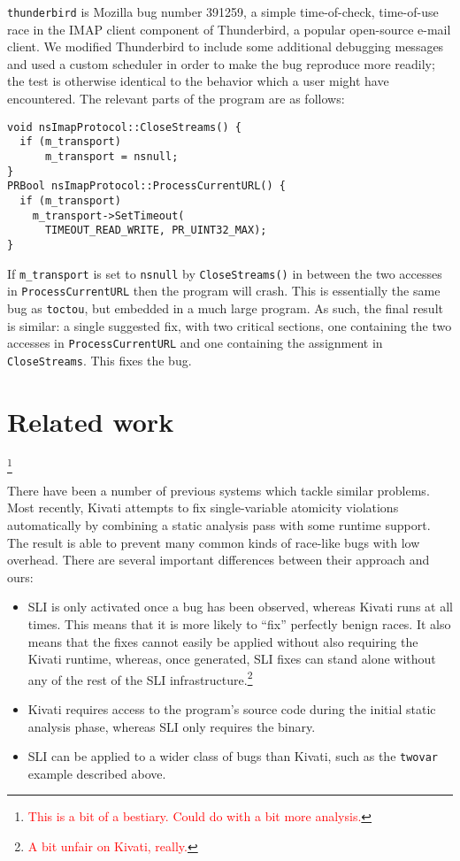 \documentclass[10pt,twocolumn,preprint,natbib,authoryear]{sigplanconf}
\newcommand{\editorial}[1]{\textcolor{red}{\footnote{\textcolor{red}{#1}}}}
\begin{document}
\verb|thunderbird| is Mozilla bug number
391259\cite{thunderbird39125}, a simple time-of-check, time-of-use
race in the IMAP client component of Thunderbird, a popular
open-source e-mail client.  We modified Thunderbird to include some
additional debugging messages and used a custom scheduler in order to
make the bug reproduce more readily; the test is otherwise identical
to the behavior which a user might have encountered.  The relevant
parts of the program are as follows:

\begin{verbatim}
void nsImapProtocol::CloseStreams() {
  if (m_transport)
      m_transport = nsnull;
}
PRBool nsImapProtocol::ProcessCurrentURL() {
  if (m_transport)
    m_transport->SetTimeout(
      TIMEOUT_READ_WRITE, PR_UINT32_MAX);
}
\end{verbatim}

\noindent
If \verb|m_transport| is set to \verb|nsnull| by \verb|CloseStreams()|
in between the two accesses in \verb|ProcessCurrentURL| then the
program will crash.  This is essentially the same bug as
\verb|toctou|, but embedded in a much large program.  As such, the
final result is similar: a single suggested fix, with two critical
sections, one containing the two accesses in \verb|ProcessCurrentURL|
and one containing the assignment in \verb|CloseStreams|.  This fixes
the bug.

\section{Related work}\editorial{This is a bit of a bestiary.  Could do with a bit more analysis.}

There have been a number of previous systems which tackle similar
problems.  Most recently, Kivati\cite{Chew2010a} attempts to fix
single-variable atomicity violations automatically by combining a
static analysis pass with some runtime support.  The result is able to
prevent many common kinds of race-like bugs with low overhead.  There
are several important differences between their approach and ours:

\begin{itemize}
\item SLI is only activated once a bug has been observed, whereas
  Kivati runs at all times.  This means that it is more likely to
  ``fix'' perfectly benign races.  It also means that the fixes cannot
  easily be applied without also requiring the Kivati runtime,
  whereas, once generated, SLI fixes can stand alone without any of
  the rest of the SLI infrastructure.\editorial{A bit unfair on
    Kivati, really.}
\item Kivati requires access to the program's source code during the
  initial static analysis phase, whereas SLI only requires the binary.
\item SLI can be applied to a wider class of bugs than Kivati, such as
  the \verb|twovar| example described above.
\end{itemize}
\end{document}

